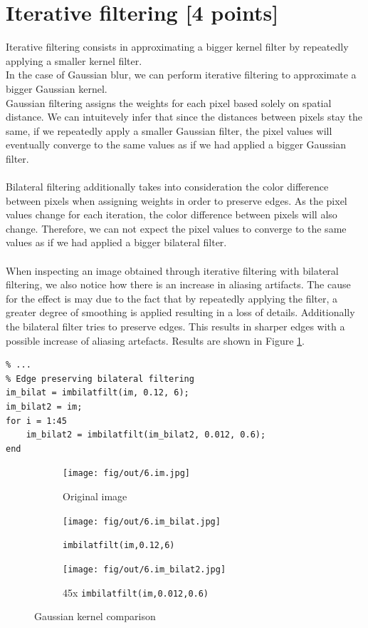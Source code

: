 \documentclass[tikz,14pt,fleqn]{article}
\begin{document}
\section{Iterative filtering [4 points]}
Iterative filtering consists in approximating a bigger kernel filter by repeatedly applying a smaller kernel filter.\\
In the case of Gaussian blur, we can perform iterative filtering to approximate a bigger Gaussian kernel.\\
Gaussian filtering assigns the weights for each pixel based solely on spatial distance. We can intuitevely infer that since the distances between pixels stay the same, if we repeatedly apply a smaller Gaussian filter, the pixel values will eventually converge to the same values as if we had applied a bigger Gaussian filter.\\\\
Bilateral filtering additionally takes into consideration the color difference between pixels when assigning weights in order to preserve edges. As the pixel values change for each iteration, the color difference between pixels will also change. Therefore, we can not expect the pixel values to converge to the same values as if we had applied a bigger bilateral filter.\\\\
When inspecting an image obtained through iterative filtering with bilateral filtering, we also notice how there is an increase in aliasing artifacts. The cause for the effect is may due to the fact that by repeatedly applying the filter, a greater degree of smoothing is applied resulting in a loss of details. Additionally the bilateral filter tries to preserve edges. This results in sharper edges with a possible increase of aliasing artefacts. Results are shown in Figure \ref{fig:6.3}.
\vspace*{-0.5cm}
\begin{verbatim} 
% ...
% Edge preserving bilateral filtering
im_bilat = imbilatfilt(im, 0.12, 6);
im_bilat2 = im;
for i = 1:45
    im_bilat2 = imbilatfilt(im_bilat2, 0.012, 0.6);
end
\end{verbatim}
\vspace*{-0.5cm}

\begin{figure}[h!]
    \centering
    \begin{subfigure}[b]{0.325\linewidth}
        \centering
        \texttt{[image: fig/out/6.im.jpg]}
        \caption{Original image}
    \end{subfigure}
    \begin{subfigure}[b]{0.325\linewidth}
        \centering
        \texttt{[image: fig/out/6.im\_bilat.jpg]}
        \caption{\texttt{imbilatfilt(im,0.12,6)}}
    \end{subfigure}
    \begin{subfigure}[b]{0.325\linewidth}
        \centering
        \texttt{[image: fig/out/6.im\_bilat2.jpg]}
        \caption{45x \texttt{imbilatfilt(im,0.012,0.6)}}
        \label{fig:6.3}
    \end{subfigure}
    \caption{Gaussian kernel comparison}
    \label{fig:6}
\end{figure}
\end{document}
